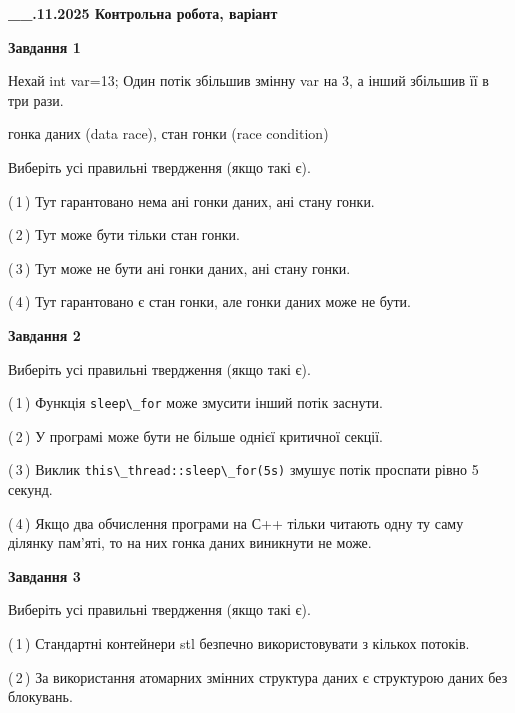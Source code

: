 \documentclass[12pt, ukrainian]{article}
\def\code#1{\Verb!#1!}
\begin{document}
\begin {large}

\textbf{\_\_.11.2025 Контрольна робота, варіант  }\par


{

\begin{center}
\textbf{Завдання 1}
\end{center}
Нехай int var=13; Один потік збільшив змінну var на 3, а інший збільшив її в три рази.

гонка даних (data race), стан гонки (race condition)

Виберіть усі правильні твердження (якщо такі є).\par
\vspace{2mm}
(\,1\,) Тут гарантовано нема ані гонки даних, ані стану гонки.%

(\,2\,) Тут може бути тільки стан гонки.%

(\,3\,) Тут може не бути ані гонки даних, ані стану гонки.%

(\,4\,) Тут гарантовано є стан гонки, але гонки даних може не бути.%



\begin{center}
\textbf{Завдання 2}
\end{center}
Виберіть усі правильні твердження (якщо такі є).\par
\vspace{2mm}

(\,1\,) Функція \code{sleep\_for} може змусити інший потік заснути.%

(\,2\,) У програмі може бути не більше однієї критичної секції.%

(\,3\,) Виклик \code{this\_thread::sleep\_for(5s)} змушує потік проспати рівно 5 секунд.%

(\,4\,) Якщо два обчислення програми на С++ тільки читають одну ту саму ділянку пам'яті, то на них гонка даних  виникнути не може.%



\begin{center}
\textbf{Завдання 3}
\end{center}
Виберіть усі правильні твердження (якщо такі є).\par
\vspace{2mm}

(\,1\,) Стандартні контейнери stl безпечно використовувати з кількох потоків.%

(\,2\,) За використання атомарних змінних структура даних є структурою даних без блокувань.%

}
\end{large}
\end{document}
